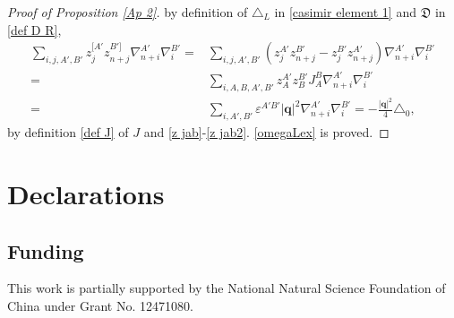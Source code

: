 \documentclass[a4paper,11pt]{amsart}
\numberwithin{equation}{section}
\begin{document}
\begin{proof}[Proof of Proposition \ref{Ap 2}]
by definition of $\triangle_L$ in \eqref{casimir element 1} and $\mathfrak{D}$ in \eqref{def D R},
\begin{equation}\begin{aligned}
\sum_{i,j,A',B'}z_{j}^{[A'} z_{n+j}^{B']} \nabla_{n+i}^{A'}\nabla_{i}^{B'}
=&\sum_{i,j,A',B'}(z_{j}^{A'} z_{n+j}^{B'}-z_{j}^{B'} z_{n+j}^{A'}) \nabla_{n+i}^{A'}\nabla_{i}^{B'}\\
=&\sum_{i,A,B,A',B'}z_{A}^{A'} z_{B}^{B'}J_A^B\nabla_{n+i}^{A'}\nabla_{i}^{B'}\\
=&\sum_{i,A',B'}\varepsilon^{A'B'}|\mathbf{q}|^2\nabla_{n+i}^{A'}\nabla_{i}^{B'}=-\frac{|\mathbf{q}|^2}{4}\triangle_0,
\end{aligned}\end{equation}
by definition \eqref{def J} of $J$ and \eqref{z jab}-\eqref{z jab2}. \eqref{omegaLex} is proved.
\end{proof}

\section*{Declarations}
\subsection*{Funding}
This work is partially supported by the National Natural Science Foundation of China under Grant No. 12471080.
\end{document}
